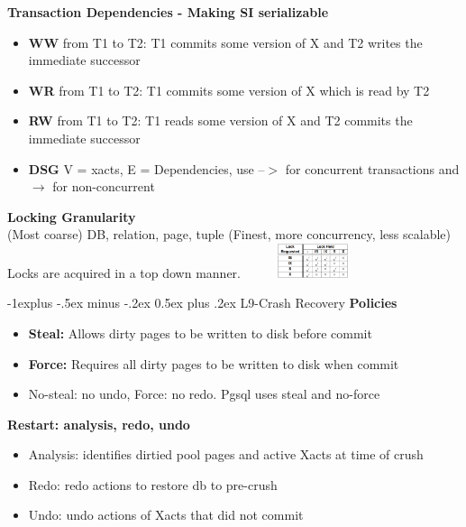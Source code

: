 \documentclass[10pt, landscape]{article}
\makeatletter
\renewcommand{\subsection}{\@startsection{subsection}{2}{0mm}%
                                {-1explus -.5ex minus -.2ex}%
                                {0.5ex plus .2ex}%
                                {\normalfont\normalsize\bfseries}}
\makeatother
\begin{document}
\begin{multicols}{4}
\textbf{Transaction Dependencies - Making SI serializable} \\
\begin{itemize}
  \item \textbf{WW} from T1 to T2: T1 commits some version of X and T2 writes the immediate successor
  \item \textbf{WR} from T1 to T2: T1 commits some version of X which is read by T2
  \item \textbf{RW} from T1 to T2: T1 reads some version of X and T2 commits the immediate successor
  \item \textbf{DSG} V = {xacts}, E = {Dependencies}, use --$>$ for concurrent transactions and $\rightarrow$ for non-concurrent
\end{itemize}

\textbf{Locking Granularity} \\ 
(Most coarse) DB, relation, page, tuple (Finest, more concurrency, less scalable) \\ 
Locks are acquired in a top down manner.
\includegraphics[width=4cm, height =1cm]{multigranular_locks.png}


\subsection{L9-Crash Recovery}
\textbf{Policies} \\
\begin{itemize}
  \item \textbf{Steal:} Allows dirty pages to be written to disk before commit
  \item \textbf{Force:} Requires all dirty pages to be written to disk when commit
  \item No-steal: no undo, Force: no redo. Pgsql uses steal and no-force
\end{itemize}

\textbf{Restart: analysis, redo, undo} \\
\begin{itemize}
  \item Analysis: identifies dirtied pool pages and active Xacts at time of crush
  \item Redo: redo actions to restore db to pre-crush
  \item Undo: undo actions of Xacts that did not commit
\end{itemize}


\end{multicols}
\end{document}
